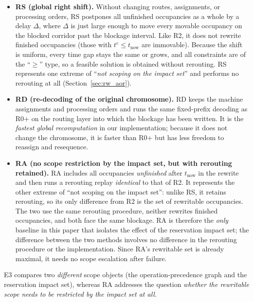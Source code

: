 \documentclass[manuscript,screen,review]{acmart}
\begin{document}
\begin{itemize}[leftmargin=1.5em,itemsep=0.25em]
\item \textbf{RS (global right shift).} Without changing routes, assignments, or processing orders, RS postpones all unfinished occupancies as a whole
by a delay \(\Delta\), where \(\Delta\) is just large enough to move every movable occupancy on the blocked corridor past the blockage interval.
Like R2, it does not rewrite finished occupancies (those with \(t^e\le t_{\mathrm{now}}\) are immovable).
Because the shift is uniform, every time gap stays the same or grows, and all constraints are of the ``\(\ge\)'' type,
so a feasible solution is obtained without rerouting. RS represents one extreme of ``\emph{not scoping on the impact set}'' and performs no rerouting at all
(Section~\ref{sec:rw_aor}).
\item \textbf{RD (re-decoding of the original chromosome).} RD keeps the machine assignments and processing orders and runs the same fixed-prefix decoding as R0+
on the routing layer into which the blockage has been written. It is the \emph{fastest global recomputation} in our implementation; because it does not change the chromosome, it is faster than R0+
but has less freedom to reassign and resequence.
\item \textbf{RA (no scope restriction by the impact set, but with rerouting retained).} RA includes all occupancies \emph{unfinished} after \(t_{\mathrm{now}}\) in the rewrite
and then runs a rerouting replay \emph{identical} to that of R2. It represents the other extreme of ``not scoping on the impact set'': unlike RS, it retains
rerouting, so its only difference from R2 is the set of rewritable occupancies. The two use the same rerouting procedure, neither rewrites finished occupancies, and both face the same blockage.
RA is therefore the \emph{only} baseline in this paper that isolates the effect of the reservation impact set; the difference between the two methods involves no difference in the rerouting procedure or the implementation.
Since RA's rewritable set is already maximal, it needs no scope escalation after failure.
\end{itemize}

E3 compares two \emph{different} scope objects (the operation-precedence graph and the reservation impact set), whereas RA addresses the question
\emph{whether the rewritable scope needs to be restricted by the impact set at all}.
\end{document}
